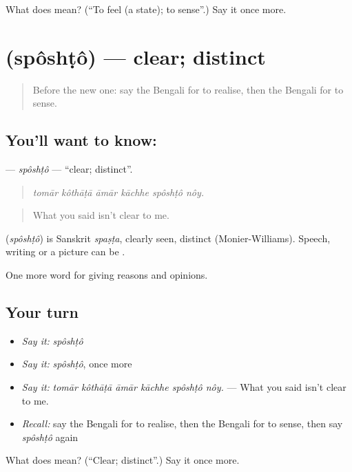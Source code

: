 \begin{tcolorbox}[breakable,colback=teal!4,colframe=teal!35!black,title={Before you move on}]
What does   mean? (\textquotedblleft{}To feel (a state); to sense\textquotedblright{}.) Say it once more.
\end{tcolorbox}
\section[\texorpdfstring{\bn{স্পষ্ট} (spôshṭô)}{স্পষ্ট (spôshṭô)}]{ (spôshṭô) — clear; distinct}

\label{lesson:BN-C362-sposhto}



\begin{quote}
Before the new one: say the Bengali for to realise, then the Bengali for to sense.
\end{quote}

\subsection*{You'll want to know: }
\textbf{} — \emph{spôshṭô} — \textquotedblleft{}clear; distinct\textquotedblright{}.

\begin{quote}
     
\end{quote}

\begin{quote}
\emph{tomār kôthāṭā āmār kāchhe spôshṭô nôy.}
\end{quote}

\begin{quote}
What you said isn't clear to me.
\end{quote}

\begin{cousinweb}
\textbf{} (\emph{spôshṭô}) is Sanskrit \emph{spaṣṭa}, clearly seen, distinct (Monier-Williams). Speech, writing or a picture can be .
\end{cousinweb}

\begin{grammarlens}[title={What you've built}]
One more word for giving reasons and opinions.
\end{grammarlens}

\subsection*{Your turn}
\begin{itemize}
\raggedright
  \item \emph{Say it:} \emph{spôshṭô}
  \item \emph{Say it:} \emph{spôshṭô}, once more
  \item \emph{Say it:} \emph{tomār kôthāṭā āmār kāchhe spôshṭô nôy.} — What you said isn't clear to me.
  \item \emph{Recall:} say the Bengali for to realise, then the Bengali for to sense, then say \emph{spôshṭô} again
\end{itemize}

\begin{tcolorbox}[breakable,colback=teal!4,colframe=teal!35!black,title={Before you move on}]
What does  mean? (\textquotedblleft{}Clear; distinct\textquotedblright{}.) Say it once more.
\end{tcolorbox}
